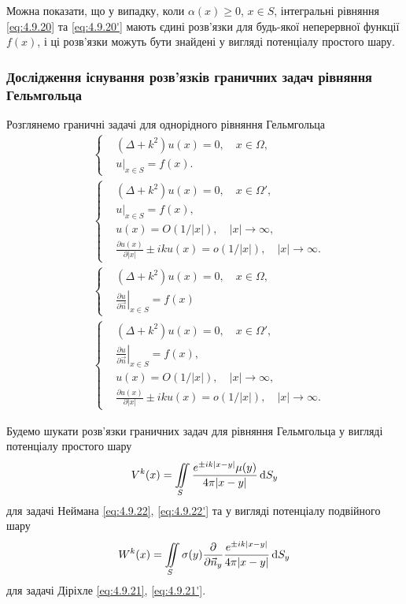 Можна показати, що у випадку, коли $\alpha(x) \ge 0$, $x \in S$, інтегральні рівняння \eqref{eq:4.9.20} та \eqref{eq:4.9.20'} мають єдині розв'язки для будь-якої неперервної функції $f(x)$, і ці розв'язки можуть бути знайдені у вигляді потенціалу простого шару. 

\subsubsection{Дослідження існування розв'язків граничних задач рівняння Гельмгольца}

Розглянемо граничні задачі для однорідного рівняння Гельмгольца
\begin{align}
	\label{eq:4.9.21}
	& \left\{
		\begin{aligned}
			& (\Delta + k^2) u(x) = 0, \quad x \in \Omega, \\
			& \left. u \right|_{x \in S} = f(x).
		\end{aligned}
	\right. \\[.5cm]
	\label{eq:4.9.21'}
	& \left\{
		\begin{aligned}
			& (\Delta + k^2) u(x) = 0, \quad x \in \Omega', \\
			& \left. u \right|_{x \in S} = f(x), \\
			& u(x) = O(1/|x|), \quad |x| \to \infty, \\
			& \frac{\partial u(x)}{\partial |x|} \pm i k u(x) = o(1/|x|), \quad |x| \to \infty.
		\end{aligned}
	\right. \\[.5cm]
	\label{eq:4.9.22}
	& \left\{
		\begin{aligned}
			& (\Delta + k^2) u(x) = 0, \quad x \in \Omega, \\
			& \left. \frac{\partial u}{\partial \vec n} \right|_{x \in S} = f(x)
		\end{aligned}
	\right. \\[.5cm]
	\label{eq:4.9.22'}
	& \left\{
		\begin{aligned}
			& (\Delta + k^2) u(x) = 0, \quad x \in \Omega', \\
			& \left. \frac{\partial u}{\partial \vec n} \right|_{x \in S} = f(x), \\
			& u(x) = O(1/|x|), \quad |x| \to \infty, \\
			& \frac{\partial u(x)}{\partial |x|} \pm i k u(x) = o(1/|x|), \quad |x| \to \infty.
		\end{aligned}
	\right.
\end{align}

Будемо шукати розв'язки граничних задач для рівняння Гельмгольца у вигляді потенціалу простого шару
\begin{equation}
	V^k(x) = \displaystyle\iint\limits_S \frac{e^{\pm i k |x - y|} \mu(y)}{4 \pi |x - y|} \mathop{}\!\mathrm{d} S_y
\end{equation}
для задачі Неймана \eqref{eq:4.9.22}, \eqref{eq:4.9.22'} та у вигляді потенціалу подвійного шару
\begin{equation}
	W^k(x) = \displaystyle\iint\limits_S \sigma(y) \frac{\partial}{\partial \vec n_y} \frac{e^{\pm i k |x - y|}}{4 \pi |x - y|} \mathop{}\!\mathrm{d} S_y
\end{equation}
для задачі Діріхле \eqref{eq:4.9.21}, \eqref{eq:4.9.21'}.

